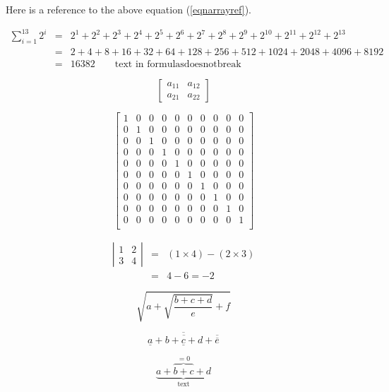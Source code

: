 \documentclass[12pt,a4paper]{article}
\theoremstyle{clearprint}
\begin{document}
Here is a reference to the above equation (\ref{eqnarrayref}). 

\noindent 
\begin{eqnarray*}
\sum_{i=1}^{13} 2^i &=& 2^1 + 2^2 + 2^3 + 2^4 + 2^5 + 2^6 + 2^7 + 2^8 + 2^9 + 2^{10} + 2^{11} + 2^{12} + 2^{13}\\
&=&2 + 4 + 8 + 16 + 32 + 64 + 128 + 256 + 512 + 1024 + 2048 + 4096 + 8192\\
&=&16382 \qquad\mbox{text in formulas} \mathrm{does not break}
\end{eqnarray*}

\noindent 
\[
\left[\begin{array}{cc} a_{11} & a_{12}\\ a_{21} & a_{22}\end{array}\right]
\]

\noindent 
\[
\left[\begin{array}{*{10}{c}} 
1 & 0 & 0 & 0 & 0 & 0 & 0 & 0 & 0 & 0 \\
0 & 1 & 0 & 0 & 0 & 0 & 0 & 0 & 0 & 0 \\
0 & 0 & 1 & 0 & 0 & 0 & 0 & 0 & 0 & 0 \\
0 & 0 & 0 & 1 & 0 & 0 & 0 & 0 & 0 & 0 \\ 
0 & 0 & 0 & 0 & 1 & 0 & 0 & 0 & 0 & 0 \\ 
0 & 0 & 0 & 0 & 0 & 1 & 0 & 0 & 0 & 0 \\ 
0 & 0 & 0 & 0 & 0 & 0 & 1 & 0 & 0 & 0 \\ 
0 & 0 & 0 & 0 & 0 & 0 & 0 & 1 & 0 & 0 \\ 
0 & 0 & 0 & 0 & 0 & 0 & 0 & 0 & 1 & 0 \\ 
0 & 0 & 0 & 0 & 0 & 0 & 0 & 0 & 0 & 1 \\ 
\end{array}\right]
\]

\noindent 
\begin{eqnarray*}
\left|\begin{array}{cc} 1 & 2\\ 3 & 4\end{array}\right| &=& (1\times 4) - (2 \times 3)\\
&=& 4-6 = -2
\end{eqnarray*}

\noindent 
\[
\sqrt{a + \sqrt{\frac{b + c + d}{e}} + f}
\]

\noindent 
\[
\overline{\underline{a} + \overline{b + \underline{c} + d} + \overline{\overline{e}}}
\]

\noindent 
\[
\underbrace{a + \overbrace{b + c}^{=0} + d}_{\mbox{text}}
\]
\end{document}
